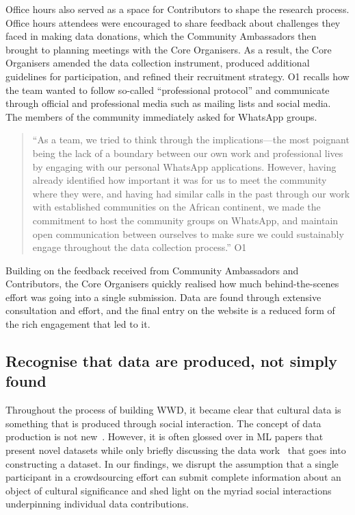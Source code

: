 Office hours also served as a space for Contributors to shape the research process. Office hours attendees were encouraged to share feedback about challenges they faced in making data donations, which the Community Ambassadors then brought to planning meetings with the Core Organisers. As a result, the Core Organisers amended the data collection instrument, produced additional guidelines for participation, and refined their recruitment strategy. O1 recalls how the team wanted to follow so-called ``professional protocol'' and communicate through official and professional media such as mailing lists and social media. The members of the community immediately asked for WhatsApp groups. 
\begin{quote}
    ``As a team, we tried to think through the implications---the most poignant being the lack of a boundary between our own work and professional lives by engaging with our personal WhatsApp applications. However, having already identified how important it was for us to meet the community where they were, and having had similar calls in the past through our work with established communities on the African continent, we made the commitment to host the community groups on WhatsApp, and maintain open communication between ourselves to make sure we could sustainably engage throughout the data collection process.'' O1 
\end{quote}
Building on the feedback received from Community Ambassadors and Contributors, the Core Organisers quickly realised how much behind-the-scenes effort was going into a single submission. Data are found through extensive consultation and effort, and the final entry on the website is a reduced form of the rich engagement that led to it. 

\subsection{Recognise that data are produced, not simply found}

Throughout the process of building \textsc{WWD}, it became clear that cultural data is something that is produced through social interaction. The concept of data production is not new~\cite{bowker2000sorting,d2024counting}. However, it is often glossed over in ML papers that present novel datasets while only briefly discussing the data work~\cite{scheuermanDatasetsHavePolitics2021} that goes into constructing a dataset. In our findings, we disrupt the assumption that a single participant in a crowdsourcing effort can submit complete information about an object of cultural significance and shed light on the myriad social interactions underpinning individual data contributions.

